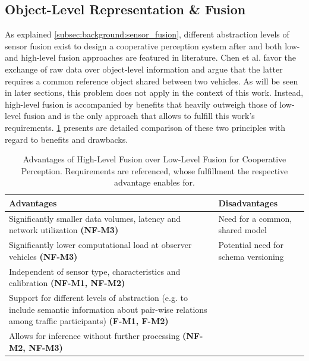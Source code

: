 \subsection{Object-Level Representation \& Fusion}
\label{subsec:concept_design:object_level_representation_fusion}
As explained \cref{subsec:background:sensor_fusion}, different abstraction levels of sensor fusion exist to design a cooperative perception system after and both low- and high-level fusion approaches are featured in literature. Chen et al. \cite{Chen2019} favor the exchange of raw data over object-level information and argue that the latter requires a common reference object shared between two vehicles. As will be seen in later sections, this problem does not apply in the context of this work. Instead, high-level fusion is accompanied by benefits that heavily outweigh those of low-level fusion and is the only approach that allows to fulfill this work's requirements. \cref{tab:comparison_fusion} presents are detailed comparison of these two principles with regard to benefits and drawbacks.

\begin{table}[H]
	\centering
	\begin{tabular}{|p{7.5cm}|p{7.5cm}|}
		\hline
		\textbf{Advantages} & \textbf{Disadvantages} \\ \hline
		Significantly smaller data volumes, latency and network utilization \textbf{(NF-M3)} & Need for a common, shared model \\ \hline
		Significantly lower computational load at observer vehicles \textbf{(NF-M3)} & Potential need for schema versioning \\ \hline
		Independent of sensor type, characteristics and calibration \textbf{(NF-M1, NF-M2)} & \multirow{3}{*}{} \\ \cline{1-1}
		Support for different levels of abstraction (e.g. to include semantic information about pair-wise relations among traffic participants) \textbf{(F-M1, F-M2)} &  \\ \cline{1-1}
		Allows for inference without further processing \textbf{(NF-M2, NF-M3)} &  \\ \hline
	\end{tabular}
	\caption[Comparison High-/Low Level Fusion]{Advantages of High-Level Fusion over Low-Level Fusion for Cooperative Perception. Requirements are referenced, whose fulfillment the respective advantage enables for.}
	\label{tab:comparison_fusion}
\end{table}

